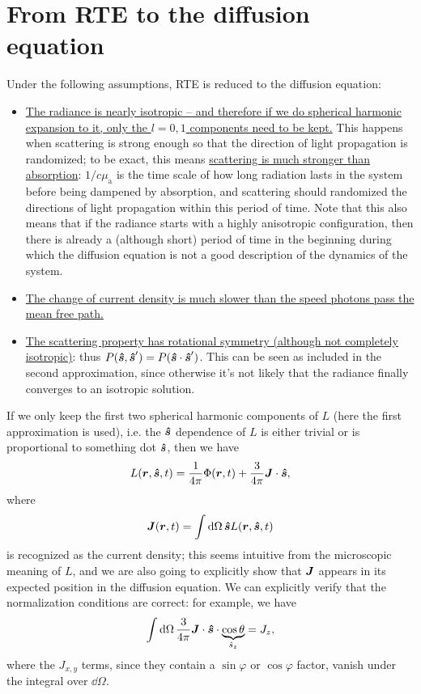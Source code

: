 \documentclass[hyperref, a4paper]{article}
\begin{document}
\section{From RTE to the diffusion equation}

Under the following assumptions, RTE is reduced to the diffusion equation: 
\begin{itemize}
    \item \ul{The radiance is nearly isotropic 
    -- and therefore if we do spherical harmonic expansion to it, 
    only the $l = 0, 1$ components need to be kept.} 
    This happens when scattering is strong enough 
    so that the direction of light propagation 
    is randomized; 
    to be exact, this means \ul{scattering is much stronger than absorption}:
    $1 / c \mu_{\text{a}}$ is the time scale of 
    how long radiation lasts in the system before being dampened by absorption, 
    and scattering should randomized the directions of light propagation 
    within this period of time. 
    Note that this also means that if the radiance starts with a highly 
    anisotropic configuration, 
    then there is already a (although short) period of time in the beginning 
    during which the diffusion equation is not a good description 
    of the dynamics of the system. 
    \item \ul{The change of current density is much slower 
    than the speed photons pass the mean free path.}
    \item \ul{The scattering property has rotational symmetry (although not completely isotropic)}:
        thus $P(\vu*{s}, \vu*{s}') = P(\vu*{s} \cdot \vu*{s}')$.
        This can be seen as included in the second approximation, 
        since otherwise it's not likely that the radiance finally converges to 
        an isotropic solution.
\end{itemize}

If we only keep the first two spherical harmonic components of $L$
(here the first approximation is used), 
i.e. the $\vu*{s}$ dependence of $L$ 
is either trivial 
or is proportional to something dot $\vu*{s}$, 
then we have
\begin{equation}
    L(\vb*{r}, \vu*{s}, t) = \frac{1}{4 \pi} \Phi(\vb*{r}, t) 
    + \frac{3}{4 \pi} \vb*{J} \cdot \vu*{s},
\end{equation}
where 
\begin{equation}
    \vb*{J}(\vb*{r}, t) = \int \dd{\Omega} \vu*{s} L(\vb*{r}, \vu*{s}, t)
\end{equation}
is recognized as the current density; 
this seems intuitive from the microscopic meaning of $L$,
and we are also going to explicitly show that $\vb*{J}$
appears in its expected position in the diffusion equation.
We can explicitly verify that the normalization conditions are correct: 
for example, we have 
\begin{equation}
    \int \dd{\Omega} \frac{3}{4 \pi} \vb*{J} \cdot \vu*{s} \cdot \underbrace{\cos \theta}_{\hat{s}_z} = 
    J_z, 
\end{equation} 
where the $J_{x, y}$ terms, since they contain a $\sin \varphi$ or $\cos \varphi$ factor, 
vanish under the integral over $\dd \Omega$. 
\end{document}
